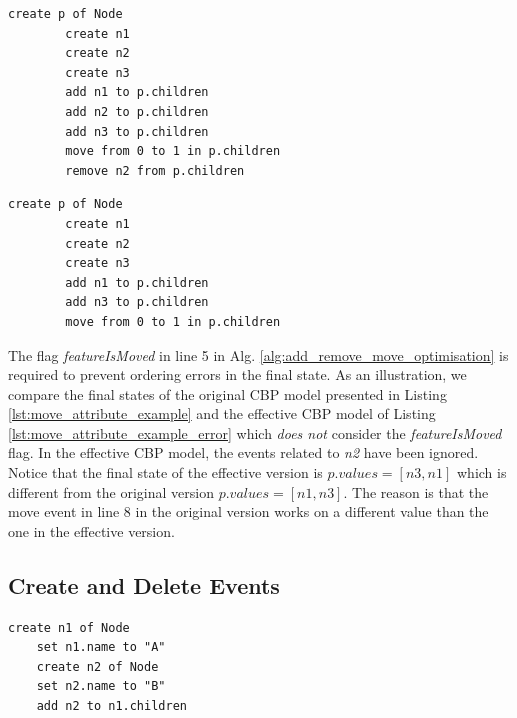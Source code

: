 \documentclass{llncs}
\begin{document}
    \noindent
    \begin{minipage}[t]{0.48\linewidth}
        \begin{lstlisting}[style=eol,caption={The CBP representation of reference \emph{children}'s move event.},label=lst:move_attribute_example]
        create p of Node
        create n1
        create n2
        create n3
        add n1 to p.children
        add n2 to p.children
        add n3 to p.children
        move from 0 to 1 in p.children
        remove n2 from p.children
        \end{lstlisting}
    \end{minipage}
    \hfill
    \begin{minipage}[t]{0.48\linewidth}
        \begin{lstlisting}[style=eol,caption={The effective CBP representation of reference \emph{children}'s move event.},label=lst:move_attribute_example_error]
        create p of Node
        create n1
        create n2
        create n3
        add n1 to p.children
        add n3 to p.children
        move from 0 to 1 in p.children
        \end{lstlisting}
    \end{minipage}
    
     The flag \emph{featureIsMoved} in line 5 in Alg. \ref{alg:add_remove_move_optimisation} is required to prevent ordering errors in the final state.
    As an illustration, we compare the final states of the original CBP model presented in Listing  \ref{lst:move_attribute_example} and the effective CBP model of Listing \ref{lst:move_attribute_example_error} which \emph{does not} consider the \emph{featureIsMoved} flag.
    In the effective CBP model, the events related to \emph{n2} have been ignored.
    Notice that the final state of the effective version is $p.values = [n3, n1]$  which is different from the original version $p.values = [n1, n3]$.
    The reason is that the move event in line 8 in the original version works on a different value than the one in the effective version.
    
    \subsection{Create and Delete Events}
    \label{subsec:create_and_delete_operations}
    
    \begin{lstlisting}[style=eol,caption={Change-based representation of the model of Fig. \ref{fig:initial_model} after removal of node \emph{n5}.},label=lst:cbpmodel_optimised]
    create n1 of Node
    set n1.name to "A"
    create n2 of Node
    set n2.name to "B"
    add n2 to n1.children
    \end{lstlisting}
    
\end{document}
